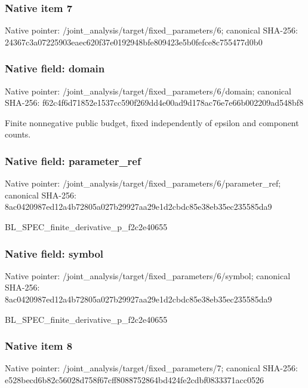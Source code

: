 \documentclass[10pt,a4paper]{article}
\begin{document}
\subsubsection{Native item 7}
Native pointer: /joint\_\allowbreak{}analysis/target/fixed\_\allowbreak{}parameters/6; canonical SHA-256: 24367c3a07225903eaec620f37e0192948bfe809423e5b0fefce8c755477d0b0

\subsubsection{Native field: domain}
Native pointer: /joint\_\allowbreak{}analysis/target/fixed\_\allowbreak{}parameters/6/domain; canonical SHA-256: f62c4f6d71852e1537cc590f269dd4e00ad9d178ac76e7e66b002209ad548bf8

\begingroup\raggedright\sloppy Finite nonnegative public budget,\allowbreak{} fixed independently of epsilon and component counts.\par\endgroup

\subsubsection{Native field: parameter\_\allowbreak{}ref}
Native pointer: /joint\_\allowbreak{}analysis/target/fixed\_\allowbreak{}parameters/6/parameter\_\allowbreak{}ref; canonical SHA-256: 8ac0420987ed12a4b72805a027b29927aa29e1d2cbdc85e38eb35ec235585da9

\begingroup\raggedright\sloppy BL\_\allowbreak{}SPEC\_\allowbreak{}finite\_\allowbreak{}derivative\_\allowbreak{}p\_\allowbreak{}f2c2e40655\par\endgroup

\subsubsection{Native field: symbol}
Native pointer: /joint\_\allowbreak{}analysis/target/fixed\_\allowbreak{}parameters/6/symbol; canonical SHA-256: 8ac0420987ed12a4b72805a027b29927aa29e1d2cbdc85e38eb35ec235585da9

\begingroup\raggedright\sloppy BL\_\allowbreak{}SPEC\_\allowbreak{}finite\_\allowbreak{}derivative\_\allowbreak{}p\_\allowbreak{}f2c2e40655\par\endgroup

\subsubsection{Native item 8}
Native pointer: /joint\_\allowbreak{}analysis/target/fixed\_\allowbreak{}parameters/7; canonical SHA-256: e528becd6b82c56028d758f67cff8088752864bd424fe2cdbf0833371acc0526
\end{document}
